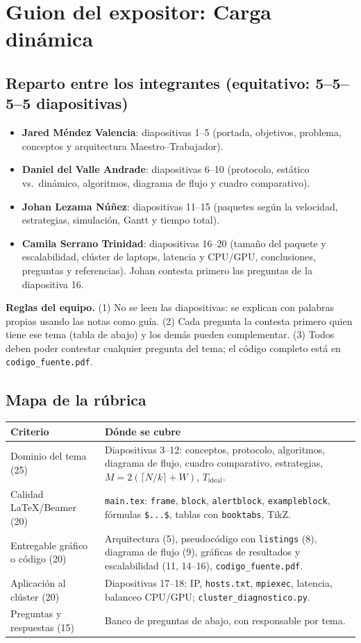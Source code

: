 \documentclass[11pt,a4paper]{article}
\begin{document}
\section*{Guion del expositor: Carga dinámica}
\subsection*{Reparto entre los integrantes (equitativo: 5--5--5--5 diapositivas)}
\begin{itemize}
  \item \textbf{Jared Méndez Valencia}: diapositivas 1--5 (portada, objetivos, problema, conceptos y arquitectura Maestro--Trabajador).
  \item \textbf{Daniel del Valle Andrade}: diapositivas 6--10 (protocolo, estático vs.\ dinámico, algoritmos, diagrama de flujo y cuadro comparativo).
  \item \textbf{Johan Lezama Núñez}: diapositivas 11--15 (paquetes según la velocidad, estrategias, simulación, Gantt y tiempo total).
  \item \textbf{Camila Serrano Trinidad}: diapositivas 16--20 (tamaño del paquete y escalabilidad, clúster de laptops, latencia y CPU/GPU, conclusiones, preguntas y referencias). Johan contesta primero las preguntas de la diapositiva 16.
\end{itemize}
\textbf{Reglas del equipo.} (1) No se leen las diapositivas: se explican con palabras propias usando las notas como guía. (2) Cada pregunta la contesta primero quien tiene ese tema (tabla de abajo) y los demás pueden complementar. (3) Todos deben poder contestar cualquier pregunta del tema; el código completo está en \texttt{codigo\_fuente.pdf}.

\subsection*{Mapa de la rúbrica}
\begin{center}\small
\begin{tabular}{@{}p{5.2cm}p{10.3cm}@{}}
\hline
\textbf{Criterio} & \textbf{Dónde se cubre}\\ \hline
Dominio del tema (25) & Diapositivas 3--12: conceptos, protocolo, algoritmos, diagrama de flujo, cuadro comparativo, estrategias, $M=2(\lceil N/k\rceil+W)$, $T_{\text{ideal}}$.\\
Calidad LaTeX/Beamer (20) & \texttt{main.tex}: \texttt{frame}, \texttt{block}, \texttt{alertblock}, \texttt{exampleblock}, fórmulas \texttt{\$...\$}, tablas con \texttt{booktabs}, TikZ.\\
Entregable gráfico o código (20) & Arquitectura (5), pseudocódigo con \texttt{listings} (8), diagrama de flujo (9), gráficas de resultados y escalabilidad (11, 14--16), \texttt{codigo\_fuente.pdf}.\\
Aplicación al clúster (20) & Diapositivas 17--18: IP, \texttt{hosts.txt}, \texttt{mpiexec}, latencia, balanceo CPU/GPU; \texttt{cluster\_diagnostico.py}.\\
Preguntas y respuestas (15) & Banco de preguntas de abajo, con responsable por tema.\\ \hline
\end{tabular}
\end{center}
\end{document}
